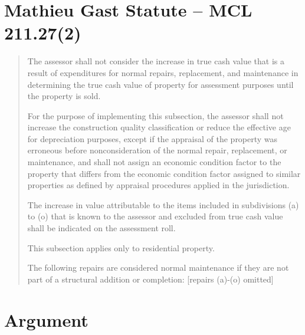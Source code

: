 \documentclass[12pt,\documentclassflag]{michiganCourtOfAppealsBrief}
\begin{document}
\section{Mathieu Gast Statute -- MCL 211.27(2)}
\begin{quotation}
The assessor shall not consider the increase in true cash value that is a result of expenditures for normal repairs, replacement, and maintenance in determining the true cash value of property for assessment purposes until the property is sold.

For the purpose of implementing this subsection, the assessor shall not increase the construction quality classification or reduce the effective age for depreciation purposes, except if the appraisal of the property was erroneous before nonconsideration of the normal repair, replacement, or maintenance, and shall not assign an economic condition factor to the property that differs from the economic condition factor assigned to similar properties as defined by appraisal procedures applied in the jurisdiction.

The increase in value attributable to the items included in subdivisions (a) to (o) that is known to the assessor and excluded from true cash value shall be indicated on the assessment roll.

This subsection applies only to residential property.

The following repairs are considered normal maintenance if they are not part of a structural addition or completion: [repairs (a)-(o) omitted]

\end{quotation}



\section{Argument}
\end{document}
